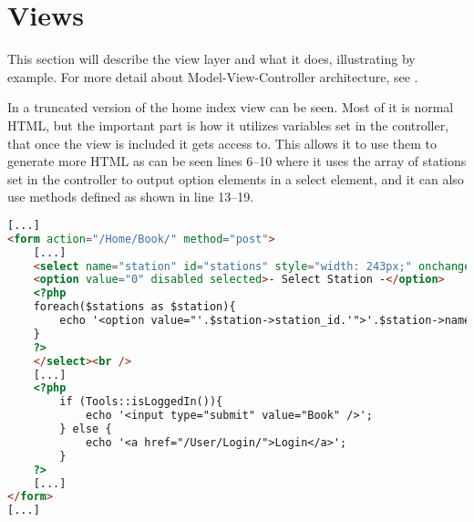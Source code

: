 \section{Views}
This section will describe the view layer and what it does, illustrating by example. For more detail about Model-View-Controller architecture, see .

In  a truncated version of the home index view can be seen. Most of it is normal HTML, but the important part is how it utilizes variables set in the controller, that once the view is included it gets access to. This allows it to use them to generate more HTML as can be seen lines 6--10 where it uses the array of stations set in the controller to output option elements in a select element, and it can also use methods defined as shown in line 13--19.

\begin{lstlisting}[language=html, label=lst:homeIndexView, caption={Home Index View}]
[...]
<form action="/Home/Book/" method="post">
    [...]
    <select name="station" id="stations" style="width: 243px;" onchange="UpdateMarker()">
    <option value="0" disabled selected>- Select Station -</option>
    <?php
    foreach($stations as $station){
        echo '<option value="'.$station->station_id.'">'.$station->name.'</option>';
    }
    ?>
    </select><br />
    [...]
    <?php
        if (Tools::isLoggedIn()){
            echo '<input type="submit" value="Book" />';
        } else {
            echo '<a href="/User/Login/">Login</a>';
        }
    ?>
    [...]
</form>
[...]
\end{lstlisting}
